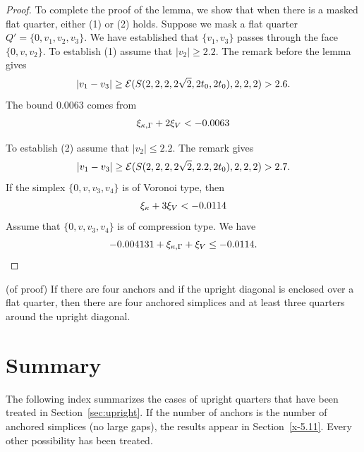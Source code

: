 \begin{proof}
To complete the proof of the lemma, we show that when
there is a masked flat quarter, either (1) or (2) holds.
Suppose we mask a flat quarter $Q'=\{0,v_1,v_2,v_3\}$.
We have established that $\{v_1,v_3\}$ passes through
the face $\{0,v,v_2\}$.
To establish (1) assume that $|v_2|\ge 2.2$.  The remark
before the lemma gives
    $$|v_1-v_3|\ge {\mathcal E}(S(2,2,2,2\sqrt{2},2t_0,2t_0),2,2,2)>2.6.$$
The bound $0.0063$ comes from
    $$\xi_{\kappa,\Gamma} + 2\xi_V < -0.0063$$

To establish (2) assume that $|v_2|\le 2.2$. The remark gives
    $$|v_1-v_3|\ge {\mathcal E}(S(2,2,2,2\sqrt{2},2.2,2t_0),2,2,2)>2.7.$$
  If the simplex
$\{0,v,v_3,v_4\}$ is of Voronoi type, then $$\xi_\kappa + 3\xi_V  < -0.0114$$
Assume that $\{0,v,v_3,v_4\}$ is of compression type. We have
    $$-0.004131 +\xi_{\kappa,\Gamma} + \xi_V \le -0.0114.$$
\end{proof}

\begin{corollary}  (of proof)\quad
If there are four anchors and if the upright diagonal is enclosed over a
flat quarter, then there are four anchored simplices and at least three
quarters around the upright diagonal.
\end{corollary}

\section{Summary}
    \label{sec:upright-summary}

The following index summarizes the cases of upright quarters that have
been treated in Section~\ref{sec:upright}. If the number of anchors is
the number of anchored simplices (no large gaps), the results appear in
Section~\ref{x-5.11}. Every other possibility has been treated.

